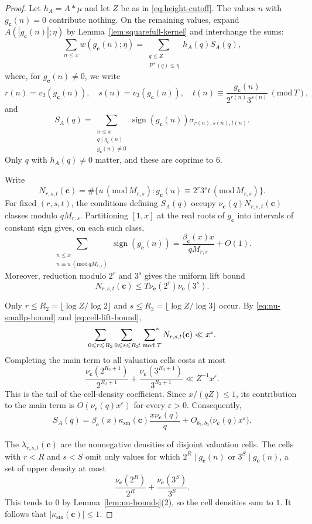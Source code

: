 \documentclass[12pt,reqno]{amsart}
\numberwithin{equation}{section}
\theoremstyle{definition}
\renewcommand{\le}{\leqslant}
\newcommand{\sumstar}{\sideset{}{^*}\sum}
\newcommand{\cc}{\mathbf{c}}
\DeclareMathOperator{\sign}{sign}
\renewcommand{\pmod}[1]{\,(\mathrm{mod}\,#1)}
\begin{document}
\begin{proof}
Let $h_A=A*\mu$ and let $Z$ be as in \eqref{eq:height-cutoff}.
The values $n$ with $g_\cc(n)=0$ contribute nothing.
On the remaining values, expand $A(|g_\cc(n)|;\eta)$ by Lemma~\ref{lem:squarefull-kernel} and interchange the sums:
\[
\sum_{n\le x}w(g_\cc(n);\eta)
=\sum_{\substack{q\le Z\\P^+(q)\le\eta}}h_A(q)S_A(q),
\]
where, for $g_\cc(n)\ne0$, we write
\[
r(n)=v_2(g_\cc(n)),\quad s(n)=v_3(g_\cc(n)),\quad
t(n)\equiv\frac{g_\cc(n)}{2^{r(n)}3^{s(n)}}\pmod T,
\]
and
\[
S_A(q)=\sum_{\substack{n\le x\\q\mid g_\cc(n)\\g_\cc(n)\ne0}}
\sign(g_\cc(n))\sigma_{r(n),s(n),t(n)}.
\]
Only $q$ with $h_A(q)\ne0$ matter, and these are coprime to $6$.

Write
\[
N_{r,s,t}(\cc)
=\#\{u\pmod{M_{r,s}}:
g_\cc(u)\equiv2^r3^s t\pmod{M_{r,s}}\}.
\]
For fixed $(r,s,t)$, the conditions defining $S_A(q)$ occupy $\nu_\cc(q)N_{r,s,t}(\cc)$ classes modulo $qM_{r,s}$.
Partitioning $[1,x]$ at the real roots of $g_\cc$ into intervals of constant sign gives, on each such class,
\[
\sum_{\substack{n\le x\\n\equiv u\pmod{qM_{r,s}}}}
\sign(g_\cc(n))
=\frac{\beta_\cc(x)x}{qM_{r,s}}+O(1).
\]
Moreover, reduction modulo $2^r$ and $3^s$ gives the uniform lift bound
\begin{equation}\label{eq:cell-lift-bound}
N_{r,s,t}(\cc)
\le T\nu_\cc(2^r)\nu_\cc(3^s).
\end{equation}

Only $r\le R_2=\lfloor\log Z/\log2\rfloor$ and $s\le R_3=\lfloor\log Z/\log3\rfloor$ occur.
By \eqref{eq:nu-smallp-bound} and \eqref{eq:cell-lift-bound},
\[
\sum_{0\le r\le R_2}\sum_{0\le s\le R_3}
\sumstar_{t\bmod T}N_{r,s,t}(\cc)
\ll x^\varepsilon.
\]
Completing the main term to all valuation cells costs at most
\[
\frac{\nu_\cc(2^{R_2+1})}{2^{R_2+1}}
+\frac{\nu_\cc(3^{R_3+1})}{3^{R_3+1}}
\ll Z^{-1}x^\varepsilon.
\]
This is the tail of the cell-density coefficient.
Since $x/(qZ)\le1$, its contribution to the main term is $O(\nu_\cc(q)x^\varepsilon)$ for every $\varepsilon>0$.
Consequently,
\begin{equation}\label{eq:generic-cell-sum}
S_A(q)
=\beta_\cc(x)\kappa_{\mathrm{sm}}(\cc)
\frac{x\nu_\cc(q)}q
+O_{b_2,b_3}\bigl(\nu_\cc(q)x^\varepsilon\bigr).
\end{equation}

The $\lambda_{r,s,t}(\cc)$ are the nonnegative densities of disjoint valuation cells.
The cells with $r<R$ and $s<S$ omit only values for which $2^R\mid g_\cc(n)$ or $3^S\mid g_\cc(n)$, a set of upper density at most
\[
\frac{\nu_\cc(2^R)}{2^R}+\frac{\nu_\cc(3^S)}{3^S}.
\]
This tends to $0$ by Lemma~\ref{lem:nu-bounds}(2), so the cell densities sum to $1$.
It follows that $|\kappa_{\mathrm{sm}}(\cc)|\le1$.


\end{proof}
\end{document}

